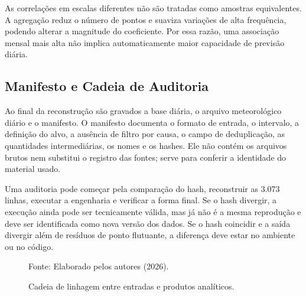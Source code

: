 As correlações em escalas diferentes não são tratadas como amostras equivalentes. A agregação reduz o número de pontos e suaviza variações de alta frequência, podendo alterar a magnitude do coeficiente. Por essa razão, uma associação mensal mais alta não implica automaticamente maior capacidade de previsão diária.

\subsection{Manifesto e Cadeia de Auditoria}

Ao final da reconstrução são gravados a base diária, o arquivo meteorológico diário e o manifesto. O manifesto documenta o formato de entrada, o intervalo, a definição do alvo, a ausência de filtro por causa, o campo de deduplicação, as quantidades intermediárias, os nomes e os hashes. Ele não contém os arquivos brutos nem substitui o registro das fontes; serve para conferir a identidade do material usado.

Uma auditoria pode começar pela comparação do hash, reconstruir as 3.073 linhas, executar a engenharia e verificar a forma final. Se o hash divergir, a execução ainda pode ser tecnicamente válida, mas já não é a mesma reprodução e deve ser identificada como nova versão dos dados. Se o hash coincidir e a saída divergir além de resíduos de ponto flutuante, a diferença deve estar no ambiente ou no código.

\begin{figure}[H]
\centering
{}
\caption{Cadeia de linhagem entre entradas e produtos analíticos.}
\small{Fonte: Elaborado pelos autores (2026).}
\label{fig:linhagem_artefatos}
\end{figure}
